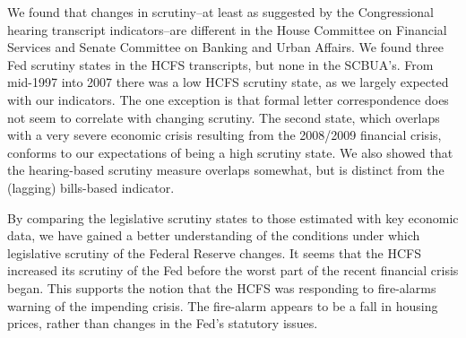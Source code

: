 \documentclass[a4paper]{article}\usepackage[]{graphicx}\usepackage[]{color}
\begin{document}
We found that changes in scrutiny--at least as suggested by the Congressional hearing transcript indicators--are different in the House Committee on Financial Services and Senate Committee on Banking and Urban Affairs. We found three Fed scrutiny states in the HCFS transcripts, but none in the SCBUA's. From mid-1997 into 2007 there was a low HCFS scrutiny state, as we largely expected with our indicators. The one exception is that formal letter correspondence does not seem to correlate with changing scrutiny. The second state, which overlaps with a very severe economic crisis resulting from the 2008/2009 financial crisis, conforms to our expectations of being a high scrutiny state. We also showed that the hearing-based scrutiny measure overlaps somewhat, but is distinct from the (lagging) bills-based indicator.

By comparing the legislative scrutiny states to those estimated with key economic data, we have gained a better understanding of the conditions under which legislative scrutiny of the Federal Reserve changes. It seems that the HCFS increased its scrutiny of the Fed before the worst part of the recent financial crisis began. This supports the notion that the HCFS was responding to fire-alarms warning of the impending crisis. The fire-alarm appears to be a fall in housing prices, rather than changes in the Fed's statutory issues.




\end{document}
